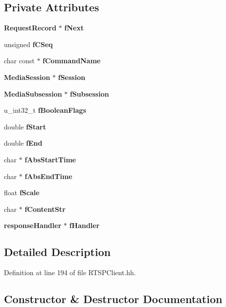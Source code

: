 \subsection*{Private Attributes}
\begin{DoxyCompactItemize}
\item 
{\bf Request\+Record} $\ast$ {\bf f\+Next}
\item 
unsigned {\bf f\+C\+Seq}
\item 
char const $\ast$ {\bf f\+Command\+Name}
\item 
{\bf Media\+Session} $\ast$ {\bf f\+Session}
\item 
{\bf Media\+Subsession} $\ast$ {\bf f\+Subsession}
\item 
u\+\_\+int32\+\_\+t {\bf f\+Boolean\+Flags}
\item 
double {\bf f\+Start}
\item 
double {\bf f\+End}
\item 
char $\ast$ {\bf f\+Abs\+Start\+Time}
\item 
char $\ast$ {\bf f\+Abs\+End\+Time}
\item 
float {\bf f\+Scale}
\item 
char $\ast$ {\bf f\+Content\+Str}
\item 
{\bf response\+Handler} $\ast$ {\bf f\+Handler}
\end{DoxyCompactItemize}


\subsection{Detailed Description}


Definition at line 194 of file R\+T\+S\+P\+Client.\+hh.



\subsection{Constructor \& Destructor Documentation}

